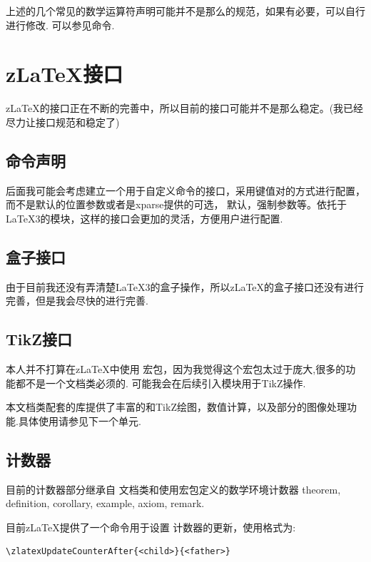 上述的几个常见的数学运算符声明可能并不是那么的规范，如果有必要，可以自行进行修改.
可以参见命令\cmd{\DeclareMathOperator}.

\section{z\LaTeX{}接口}
z\LaTeX{}的接口正在不断的完善中，所以目前的接口可能并不是那么稳定。(我已经尽力让接口规范和稳定了)

\subsection{命令声明}
后面我可能会考虑建立一个用于自定义命令的接口，采用键值对的方式进行配置，而不是默认的位置参数或者是xparse提供的可选，
默认，强制参数等。依托于\LaTeX3的模块，这样的接口会更加的灵活，方便用户进行配置.

\subsection{盒子接口}
由于目前我还没有弄清楚\LaTeX3的盒子操作，所以z\LaTeX{}的盒子接口还没有进行完善，但是我会尽快的进行完善.

\subsection{TikZ接口}
本人并不打算在z\LaTeX{}中使用  宏包，因为我觉得这个宏包太过于庞大,很多的功能都不是一个文档类必须的.
可能我会在后续引入模块用于TikZ操作. 

\begin{leftbar}
本文档类配套的库提供了丰富的和TikZ绘图，数值计算，以及部分的图像处理功能.具体使用请参见下一个单元.
\end{leftbar}

\subsection{计数器}
目前的计数器部分继承自 文档类和使用宏包定义的数学环境计数器 
theorem, definition, corollary, example, axiom, remark.

目前z\LaTeX{}提供了一个命令\cmd{\zlatexUpdateCounterAfter}\index{\cmd{\zlatexUpdateCounterAfter}}用于设置
计数器的更新，使用格式为:
\begin{verbatim}
\zlatexUpdateCounterAfter{<child>}{<father>}
\end{verbatim}

